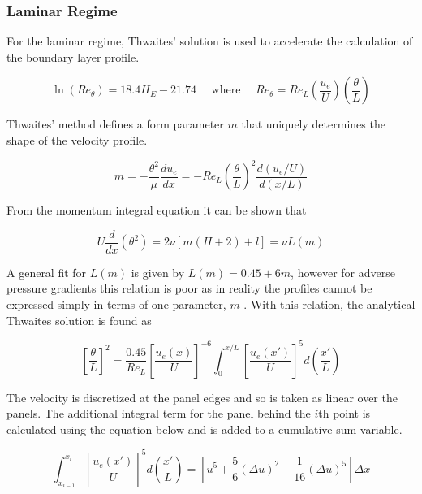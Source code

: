 \documentclass{article}
\begin{document}
\subsubsection{Laminar Regime}

For the laminar regime, Thwaites' solution is used to accelerate the calculation of the boundary layer profile.

\begin{equation}
    \ln(Re_\theta) = 18.4 H_E - 21.74 \quad \text{ where } \quad Re_\theta = Re_L\left( \frac{u_e}{U} \right) \left( \frac{\theta}{L} \right)
\end{equation}

Thwaites' method defines a form parameter $m$ that uniquely determines the shape of the velocity profile.

\begin{equation}
    m = - \frac{\theta^2}{\mu}\frac{du_e}{dx} = -Re_L \left( \frac{\theta}{L} \right)^2 \frac{d(u_e / U)}{d(x/L)}
    \label{}
\end{equation}

From the momentum integral equation it can be shown that

\begin{equation}
    U\frac{d}{dx}\left( \theta^2 \right) = 2\nu[m(H+2) + l] = \nu L(m)
\end{equation}

A general fit for $L(m)$ is given by $L(m) = 0.45 + 6m$, however for adverse pressure gradients this relation is poor
as in reality the profiles cannot be expressed simply in terms of one parameter, $m$ \cite{BL_notes}.
With this relation, the analytical Thwaites solution is found as

\begin{equation}
    \left[ \frac{\theta}{L}\right]^2 = \frac{0.45}{Re_L} \left[\frac{u_e(x)}{U} \right]^{-6} \int_0^{x/L} \left[ \frac{u_e(x')}{U} \right]^5 d \left( \frac{x'}{L} \right)
\end{equation}

The velocity is discretized at the panel edges and so is taken as linear over the panels.
The additional integral term for the panel behind the $i$th point is calculated using the equation below and is added to a cumulative sum variable.

\begin{equation}
    \int_{x_{i-1}}^{x_i} \left[ \frac{u_e(x')}{U} \right]^5 d \left( \frac{x'}{L} \right) = \left[ \bar{u}^5 + \frac{5}{6}(\Delta u)^2 + \frac{1}{16}(\Delta u)^5 \right] \Delta x
\end{equation}
\end{document}
